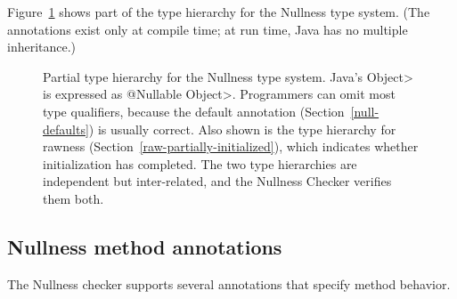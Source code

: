 Figure~\ref{fig:nonnull-hierarchy} shows part of the type hierarchy for the
Nullness type system.
(The annotations exist only at compile time; at run time, Java has no
multiple inheritance.)

\begin{figure}
\caption{Partial type hierarchy for the Nullness type system.
Java's \<Object> is expressed as \<@Nullable Object>.  Programmers can omit
most type qualifiers, because the default annotation
(Section~\ref{null-defaults}) is usually correct.  Also shown is the
type hierarchy for rawness (Section~\ref{raw-partially-initialized}), which
indicates whether
initialization has completed.  The two type hierarchies are independent but
inter-related, and the Nullness Checker verifies them both.}
\label{fig:nonnull-hierarchy}
\end{figure}


\subsection{Nullness method annotations\label{nullness-non-qualifiers}}

The Nullness checker supports several annotations that specify method
behavior.

